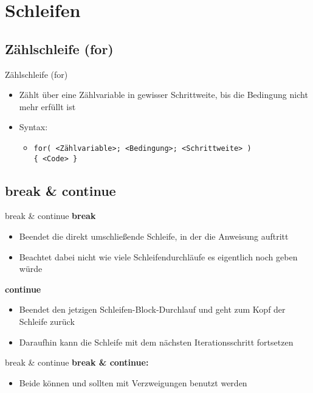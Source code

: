 \section{Schleifen}
\subsection{Zählschleife (for)}
\begin{frame}{Zählschleife (for)}
	\begin{itemize}
		\item Zählt über eine Zählvariable in gewisser Schrittweite, bis die Bedingung nicht mehr erfüllt ist
		\item Syntax:
		\begin{itemize}
			\item \texttt{for( \alert{<Zählvariable>}; \alert{<Bedingung>}; \alert{<Schrittweite>} )\\ \{ \alert{<Code>} \}}
		\end{itemize}
	\end{itemize}
		
\end{frame}

\subsection{break \& continue}
\begin{frame}{break \& continue}
	\textbf{break}\\
	\begin{itemize}
		\item Beendet die direkt umschließende Schleife, in der die Anweisung auftritt
		\item Beachtet dabei nicht wie viele Schleifendurchläufe es eigentlich noch geben würde
	\end{itemize}
	\textbf{continue}\\
	\begin{itemize}
		\item Beendet den jetzigen Schleifen-Block-Durchlauf und geht zum Kopf der Schleife zurück
		\item Daraufhin kann die Schleife mit dem nächsten Iterationsschritt fortsetzen
	\end{itemize}
\end{frame}

\begin{frame}{break \& continue}
	\textbf{break \& continue:}\\
	\begin{itemize}
		\item Beide können und sollten mit Verzweigungen benutzt werden
	\end{itemize}
	
\end{frame}

